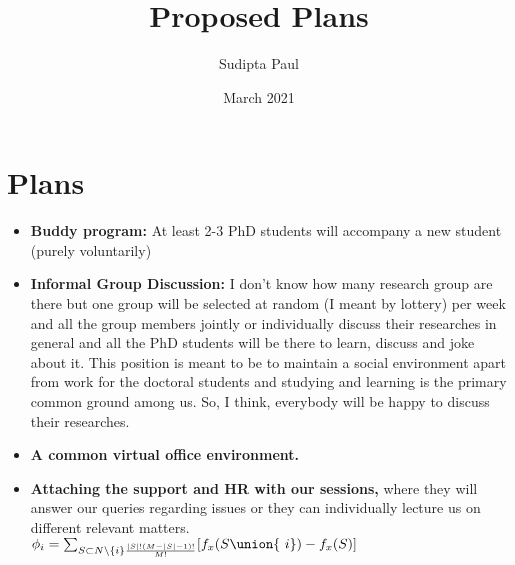 \documentclass{article}
\title{Proposed Plans}
\author{Sudipta Paul }
\date{March 2021}
\begin{document}
\maketitle

\section{Plans}
\begin{itemize}
    \item \textbf{Buddy program:} At least 2-3 PhD students will accompany a new student (purely voluntarily)
    \item \textbf{Informal Group Discussion:} I don't know how many research group are there but one group will be selected at random (I meant by lottery) per week and all the group members jointly or individually discuss their researches in general and all the PhD students will be there to learn, discuss and joke about it. This position is meant to be to maintain a social environment apart from work for the doctoral students and studying and learning is the primary common ground among us. So, I think, everybody will be happy to discuss their researches.
    \item \textbf{A common virtual office environment.}
    \item \textbf{Attaching the support and HR with our sessions,} where they will answer our queries regarding issues or they can individually lecture us on different relevant matters.
    $\phi_i = \sum_{S \subset N \setminus \{i\}\frac{|S|!(M-|S|-1)!}{M!}}[f_x(S \union \{\ i\})- f_x(S)]$
\end{itemize}
\end{document}
